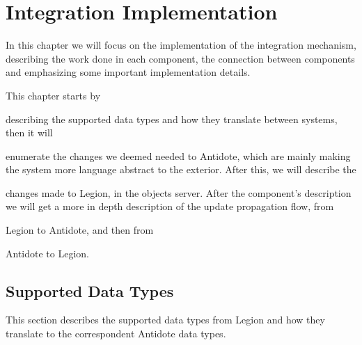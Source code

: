 \chapter{Integration Implementation}
\label{cha:integration_implementation}

In this chapter we will focus on the implementation of the integration mechanism, describing the work done in each component, the connection between components and emphasizing some important implementation details.\par
	This chapter starts by
\begin{enumerate*}[(i)]

\item describing the supported data types and how they translate between systems, then it will 

\item enumerate the changes we deemed needed to Antidote, which are mainly making the system more language abstract to the exterior. After this, we will describe the 

\item changes made to Legion, in the objects server. After the component's description we will get a more in depth description of the update propagation flow, from

\item Legion to Antidote, and then from

\item Antidote to Legion.

\end{enumerate*}	

\section{Supported Data Types}
\label{sec:supported_data_types}
This section describes the supported data types from Legion and how they translate to the correspondent Antidote data types.

